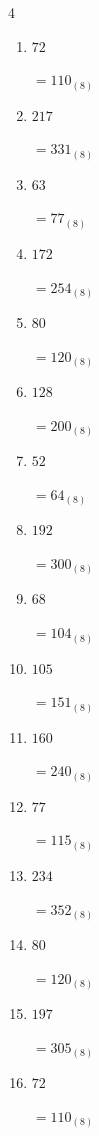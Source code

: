 \begin{multicols}{4}
\begin{enumerate}
        $=263_{(8)}$

  \item $72$

        $=110_{(8)}$

  \item $217$

        $=331_{(8)}$

  \item $63$

        $=77_{(8)}$

\columnbreak %

  \item $172$

        $=254_{(8)}$

  \item $80$

        $=120_{(8)}$

  \item $128$

        $=200_{(8)}$

  \item $52$

        $=64_{(8)}$

  \item $192$

        $=300_{(8)}$

  \item $68$

        $=104_{(8)}$

  \item $105$

        $=151_{(8)}$

  \item $160$

        $=240_{(8)}$

  \item $77$

        $=115_{(8)}$

  \item $234$

        $=352_{(8)}$

  \item $80$

        $=120_{(8)}$

  \item $197$

        $=305_{(8)}$

  \item $72$

        $=110_{(8)}$


\end{enumerate}
\end{multicols}
